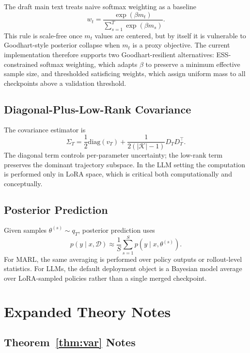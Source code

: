 \documentclass[10pt]{article}
\theoremstyle{plain}
\theoremstyle{definition}
\theoremstyle{remark}
\newcommand{\diag}{\mathrm{diag}}
\begin{document}
The draft main text treats naive softmax weighting as a baseline
\begin{equation}
w_t = \frac{\exp(\beta m_t)}{\sum_{s=1}^T \exp(\beta m_s)}.
\end{equation}
This rule is scale-free once $m_t$ values are centered, but by itself it is vulnerable to Goodhart-style posterior collapse when $m_t$ is a proxy objective. The current implementation therefore supports two Goodhart-resilient alternatives: ESS-constrained softmax weighting, which adapts $\beta$ to preserve a minimum effective sample size, and thresholded satisficing weights, which assign uniform mass to all checkpoints above a validation threshold.

\subsection{Diagonal-Plus-Low-Rank Covariance}

The covariance estimator is
\begin{equation}
\Sigma_T = \frac{1}{2}\diag(v_T) + \frac{1}{2(|\mathcal{K}|-1)}D_TD_T^\top.
\end{equation}
The diagonal term controls per-parameter uncertainty; the low-rank term preserves the dominant trajectory subspace. In the LLM setting the computation is performed only in LoRA space, which is critical both computationally and conceptually.

\subsection{Posterior Prediction}

Given samples $\theta^{(s)} \sim q_T$, posterior prediction uses
\begin{equation}
p(y \mid x, \mathcal{D}) \approx \frac{1}{S}\sum_{s=1}^S p(y \mid x, \theta^{(s)}).
\end{equation}
For MARL, the same averaging is performed over policy outputs or rollout-level statistics. For LLMs, the default deployment object is a Bayesian model average over LoRA-sampled policies rather than a single merged checkpoint.

\section{Expanded Theory Notes}

\subsection{Theorem~\ref{thm:var} Notes}
\end{document}
